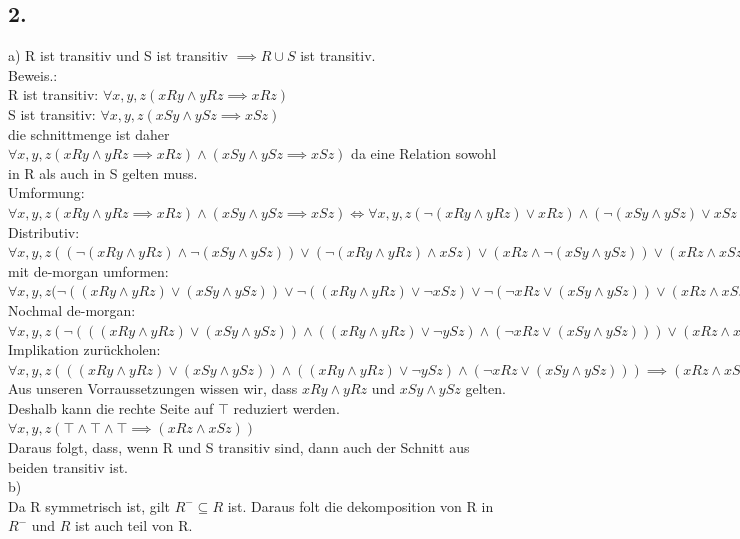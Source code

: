 \documentclass{article}
\begin{document}
	\subsection{2.}
	a) R ist transitiv und S ist transitiv $\implies R\cup S$ ist transitiv.\\
	Beweis.:\\
	R ist transitiv: $\forall x,y,z({xRy\land yRz\implies xRz })$\\
	S ist transitiv: $\forall x,y,z({xSy\land ySz\implies xSz })$\\
	die schnittmenge ist daher $\forall x,y,z{(xRy\land yRz\implies xRz )\land (xSy\land ySz\implies xSz )}$ da eine Relation sowohl in R als auch in S gelten muss.\\
	Umformung:\\
	$\forall x,y,z{(xRy\land yRz\implies xRz )\land (xSy\land ySz\implies xSz )}\iff \forall x,y,z{(\lnot(xRy\land yRz)\lor xRz )\land (\lnot(xSy\land ySz)\lor xSz)}$\\
	Distributiv:\\
	$\forall x,y,z ((\lnot(xRy\land yRz)\land\lnot(xSy\land ySz))\lor (\lnot(xRy\land yRz)\land xSz)\lor (xRz\land\lnot(xSy\land ySz))\lor(xRz\land xSz))$\\
	mit de-morgan umformen:\\
	$\forall x,y,z(\lnot ((xRy\land yRz)\lor(xSy\land ySz))\lor \lnot((xRy\land yRz)\lor \lnot xSz)\lor \lnot(\lnot xRz\lor (xSy\land ySz))\lor (xRz\land xSz)$\\
	Nochmal de-morgan:\\
	$\forall x,y,z(\lnot(((xRy\land yRz)\lor (xSy\land ySz))\land((xRy\land yRz)\lor\lnot ySz)\land (\lnot xRz \lor (xSy\land ySz)))\lor (xRz\land xSz) )$\\
	Implikation zurückholen:\\
	$\forall x,y,z (((xRy\land yRz)\lor (xSy\land ySz))\land((xRy\land yRz)\lor\lnot ySz)\land (\lnot xRz \lor (xSy\land ySz)))\implies (xRz\land xSz)) $\\
	Aus unseren Vorraussetzungen wissen wir, dass $xRy\land yRz$ und $xSy\land ySz$ gelten.\\
	Deshalb kann die rechte Seite auf $\top$ reduziert werden.\\
	$\forall x,y,z (\top\land\top\land\top\implies (xRz\land xSz))$\\
	Daraus folgt, dass, wenn R und S transitiv sind, dann auch der Schnitt aus beiden transitiv ist.\\
	b)\\
	Da R symmetrisch ist, gilt $R^-\subseteq R$ ist. Daraus folt die dekomposition von R in $R^-$ und $R$ ist auch teil von R.\\
\end{document}
